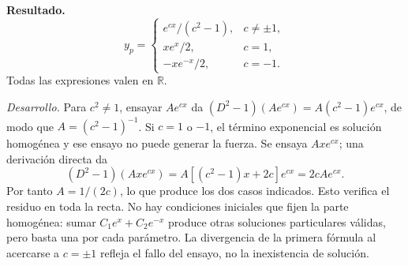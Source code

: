 \noindent\textbf{Resultado.} \[y_p=\begin{cases}e^{cx}/(c^2-1),&c\ne\pm1,\\ xe^x/2,&c=1,\\-xe^{-x}/2,&c=-1.\end{cases}\] Todas las expresiones valen en \(\mathbb R\).

\noindent\textit{Desarrollo.} Para \(c^2\ne1\), ensayar \(Ae^{cx}\) da \((D^2-1)(Ae^{cx})=A(c^2-1)e^{cx}\), de modo que \(A=(c^2-1)^{-1}\).
Si \(c=1\) o \(-1\), el término exponencial es solución homogénea y ese ensayo no puede generar la fuerza. Se ensaya \(Axe^{cx}\); una derivación directa da
\[(D^2-1)(Axe^{cx})=A[(c^2-1)x+2c]e^{cx}=2cAe^{cx}.\]
Por tanto \(A=1/(2c)\), lo que produce los dos casos indicados. Esto verifica el residuo en toda la recta. No hay condiciones iniciales que fijen la parte homogénea: sumar \(C_1e^x+C_2e^{-x}\) produce otras soluciones particulares válidas, pero basta una por cada parámetro. La divergencia de la primera fórmula al acercarse a \(c=\pm1\) refleja el fallo del ensayo, no la inexistencia de solución.
